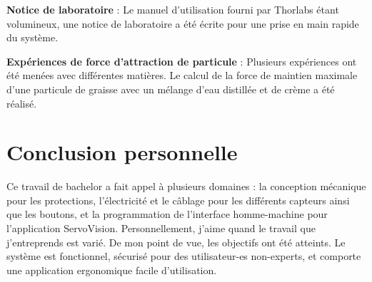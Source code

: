 \textbf{Notice de laboratoire} :
Le manuel d'utilisation fourni par Thorlabs étant volumineux, une notice de laboratoire a été écrite pour une prise en main rapide du système.

\textbf{Expériences de force d'attraction de particule} :
Plusieurs expériences ont été menées avec différentes matières. Le calcul de la force de maintien maximale d'une particule de graisse avec un mélange d'eau distillée et de crème a été réalisé.

\section*{Conclusion personnelle}
Ce travail de bachelor a fait appel à plusieurs domaines : la conception mécanique pour les protections, l'électricité et le câblage pour les différents capteurs ainsi que les boutons, et la programmation de l'interface homme-machine pour l'application ServoVision. Personnellement, j'aime quand le travail que j'entreprends est varié. De mon point de vue, les objectifs ont été atteints. Le système est fonctionnel, sécurisé pour des utilisateur-es non-experts, et comporte une application ergonomique facile d'utilisation.
\vfil
\hspace{8cm}\makeatletter\@author\makeatother\par
\hspace{8cm}\begin{minipage}{5cm}
    \printsignature
\end{minipage}